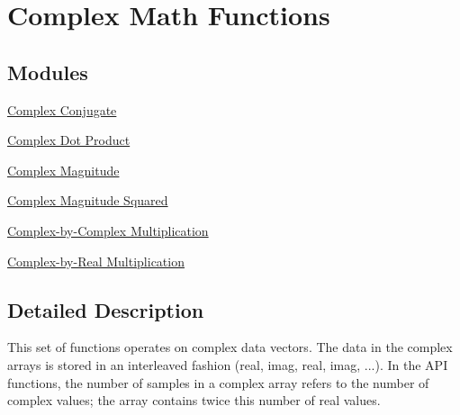 \hypertarget{group__group_cmplx_math}{\section{Complex Math Functions}
\label{group__group_cmplx_math}
}
\subsection*{Modules}
\begin{DoxyCompactItemize}
\item 
\hyperlink{group__cmplx__conj}{Complex Conjugate}
\item 
\hyperlink{group__cmplx__dot__prod}{Complex Dot Product}
\item 
\hyperlink{group__cmplx__mag}{Complex Magnitude}
\item 
\hyperlink{group__cmplx__mag__squared}{Complex Magnitude Squared}
\item 
\hyperlink{group___cmplx_by_cmplx_mult}{Complex-\/by-\/\-Complex Multiplication}
\item 
\hyperlink{group___cmplx_by_real_mult}{Complex-\/by-\/\-Real Multiplication}
\end{DoxyCompactItemize}


\subsection{Detailed Description}
This set of functions operates on complex data vectors. The data in the complex arrays is stored in an interleaved fashion (real, imag, real, imag, ...). In the A\-P\-I functions, the number of samples in a complex array refers to the number of complex values; the array contains twice this number of real values. 